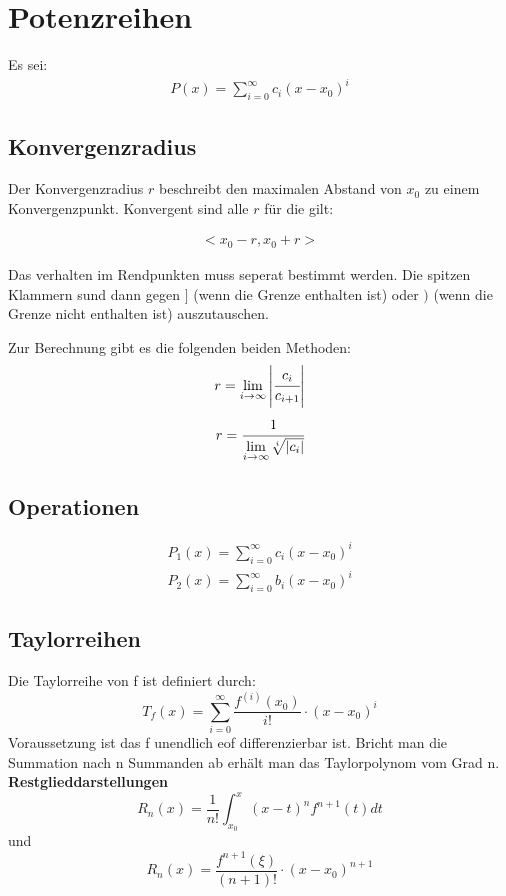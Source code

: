 \documentclass[german]{latex4ei/latex4ei_sheet}
\begin{document}
\section{Potenzreihen}
\begin{sectionbox}

Es sei: 
 \begin{align*}
  P(x) = \sum_{i=0}^{\infty} c_i \left( x-x_0\right)^i
 \end{align*}
 
 \subsection{Konvergenzradius}
 Der Konvergenzradius $r$ beschreibt den maximalen Abstand von $x_0$ zu einem Konvergenzpunkt. Konvergent sind alle $r$ für die gilt:
 
 \begin{align*}
 <x_0 - r, x_0 + r>
 \end{align*}
 
 Das verhalten im Rendpunkten muss seperat bestimmt werden. Die spitzen Klammern sund dann gegen $]$ (wenn die Grenze enthalten ist) oder $)$ (wenn die Grenze nicht enthalten ist) auszutauschen. 
 
 Zur Berechnung gibt es die folgenden beiden Methoden:
 \begin{align*}
  r = \lim\limits_{i \rightarrow \infty} \left|\cfrac{c_i}{c_{i + 1}}\right|
 \end{align*}
 \begin{align*}
  r =  \cfrac{1}{\lim\limits_{i \rightarrow \infty} \sqrt[i]{|c_i|} }
 \end{align*}
 
 \subsection{Operationen}
 \begin{align*}
  P_1(x) = \sum_{i=0}^{\infty} c_i \left( x-x_0\right)^i
 \end{align*}
 \begin{align*}
  P_2(x) = \sum_{i=0}^{\infty} b_i \left( x-x_0\right)^i
 \end{align*}


 
 \subsection{Taylorreihen}
 Die Taylorreihe von f ist definiert durch: 
 $$ T_f(x) = \sum_{i = 0}^{\infty} \frac{f^{(i)}(x_0) }{i!} \cdot (x-x_0)^i$$ 
 Voraussetzung ist das f unendlich eof differenzierbar ist. 
 Bricht man die Summation nach n Summanden ab erhält man das Taylorpolynom vom Grad n. 
 \textbf{Restglieddarstellungen} 
 $$ R_n(x) = \frac{1}{n!} \int_{x_0}^{x}(x-t)^n f^{n+1} (t) dt $$ 
 und 
 $$ R_n(x) = \frac{f^{n+1}(\xi)}{(n+1)!}\cdot (x - x_0)^{n+1}$$ 
 

\end{sectionbox}
\end{document}
